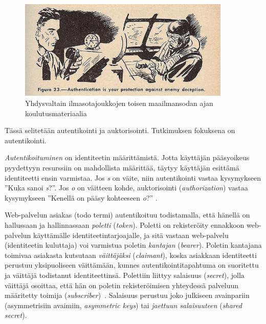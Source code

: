 \documentclass[finnish,gradu]{tktltiki}
\begin{document}
  \begin{figure}[h!]
    \centering
    \includegraphics[width=0.9\textwidth]{images/usnavy_authentication.jpg}
    \caption{Yhdysvaltain ilmasotajoukkojen toisen maailmansodan ajan koulutusmateriaalia~\cite{usnavy_authentication}}
    \label{fig:autentikointi_suojaa_viholliselta}
  \end{figure}

  Tässä selitetään autentikointi ja auktorisointi. Tutkimuksen fokuksena on autentikointi.


  \emph{Autentikoituminen} on identiteetin määrittämistä. Jotta käyttäjän pääsyoikeus pyydettyyn resurssiin on mahdollista määrittää, täytyy käyttäjän esittämä identiteetti ensin varmistaa. Jos \emph{s} on väite, niin autentikointi vastaa kysymykseen ''Kuka sanoi \emph{s}?''. Jos \emph{o} on väitteen kohde, auktorisointi (\emph{authorization}) vastaa kysymykseen ''Kenellä on pääsy kohteeseen \emph{o}?'' \cite{lampson_distributed_1992}.


  Web-palvelun asiakas (todo termi) autentikoituu todistamalla, että hänellä on hallussaan ja hallinnassaan \emph{poletti} (\emph{token}). Poletti on rekisteröity ennakkoon web-palvelun käyttämälle identiteetintarjoajalle, ja sitä vastaan web-palvelu (identiteetin kuluttaja) voi varmistua poletin \emph{kantajan} (\emph{bearer}). Poletin kantajana toimivaa asiakasta kutsutaan \emph{väittäjäksi} (\emph{claimant}), koska asiakkaan identiteetti perustuu yksipuoliseen väittämään, kunnes autentikointitapahtuma on suoritettu ja väittäjä todistanut identiteettinsä. Polettiin liittyy salaisuus (\emph{secret}), jolla väittäjä osoittaa, että hän on poletin rekisteröimisen yhteydessä palveluun määritetty toimija (\emph{subscriber})~\cite{NIST_SP800-63-1}. Salaisuus perustuu joko julkiseen avainpariin (asymmetrisiin avaimiin, \emph{asymmetric keys}) tai \emph{jaettuun salaisuuteen} (\emph{shared secret}).
\end{document}
